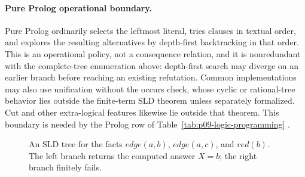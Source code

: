 \paragraph{Pure Prolog operational boundary.}
Pure Prolog ordinarily selects the leftmost literal, tries clauses in textual
order, and explores the resulting alternatives by depth-first backtracking in
that order.  This is an operational policy, not a consequence relation, and it
is nonredundant with the complete-tree enumeration above: depth-first search
may diverge on an earlier branch before reaching an existing refutation.
Common implementations may also use unification without the occurs check,
whose cyclic or rational-tree behavior lies outside the finite-term SLD
theorem unless separately formalized.  Cut and other extra-logical features
likewise lie outside that theorem.  This boundary is needed by the Prolog row
of Table~\ref{tab:p09-logic-programming}
\cite{Lloyd1987,ISO13211-1-1995}.

\begin{figure}[htbp]
\centering
{}
\caption{An SLD tree for the facts \(edge(a,b)\), \(edge(a,c)\), and \(red(b)\).
The left branch returns the computed answer \(X=b\); the right branch finitely
fails.}
\label{fig:p09-sld-tree}
\end{figure}

